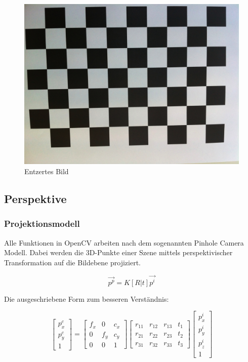 \documentclass[main.tex]{subfiles}
\begin{document}
\begin{figure}[!ht]
\centering
\includegraphics[scale=0.1]{images/chessboard-undisorted.jpg} 
\caption{Entzertes Bild}
\label{fig:chessboard-undisorted}
\end{figure}

\subsection{Perspektive}

\subsubsection{Projektionsmodell}
Alle Funktionen in OpenCV arbeiten nach dem sogenannten Pinhole Camera Modell. Dabei werden die 3D-Punkte einer Szene mittels perspektivischer Transformation auf die Bildebene projiziert.

\begin{equation}
\vec{p^p} = K [R|t] \vec{p^i}
\end{equation}

Die ausgeschriebene Form zum besseren Verständnis:

\begin{equation}
\begin{bmatrix}	
p^c_x \\ p^c_y \\ 1
\end{bmatrix} 
=
\begin{bmatrix}
f_x & 0 & c_x \\
0 & f_y & c_y \\
0 & 0 & 1
\end{bmatrix} 
\begin{bmatrix}
r_{11} & r_{12} & r_{13} & t_1 \\
r_{21} & r_{22} & r_{23} & t_2 \\
r_{31} & r_{32} & r_{33} & t_3
\end{bmatrix} 
\begin{bmatrix}
p^i_x \\ p^i_y \\ p^i_z \\ 1
\end{bmatrix} 
\end{equation}
\end{document}

